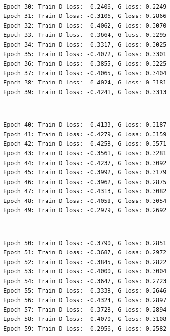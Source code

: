 \documentclass[11pt]{article}
\begin{document}
    \begin{center}
    \end{center}
    { \hspace*{\fill} \\}
    
    \begin{Verbatim}[commandchars=\\\{\}]
Epoch 30: Train D loss: -0.2406, G loss: 0.2249
Epoch 31: Train D loss: -0.3106, G loss: 0.2866
Epoch 32: Train D loss: -0.4062, G loss: 0.3070
Epoch 33: Train D loss: -0.3664, G loss: 0.3295
Epoch 34: Train D loss: -0.3317, G loss: 0.3025
Epoch 35: Train D loss: -0.4072, G loss: 0.3301
Epoch 36: Train D loss: -0.3855, G loss: 0.3225
Epoch 37: Train D loss: -0.4065, G loss: 0.3404
Epoch 38: Train D loss: -0.4024, G loss: 0.3181
Epoch 39: Train D loss: -0.4241, G loss: 0.3313

    \end{Verbatim}

    \begin{center}
    \end{center}
    { \hspace*{\fill} \\}
    
    \begin{Verbatim}[commandchars=\\\{\}]
Epoch 40: Train D loss: -0.4133, G loss: 0.3187
Epoch 41: Train D loss: -0.4279, G loss: 0.3159
Epoch 42: Train D loss: -0.4258, G loss: 0.3571
Epoch 43: Train D loss: -0.3561, G loss: 0.3281
Epoch 44: Train D loss: -0.4237, G loss: 0.3092
Epoch 45: Train D loss: -0.3992, G loss: 0.3179
Epoch 46: Train D loss: -0.3962, G loss: 0.2875
Epoch 47: Train D loss: -0.4313, G loss: 0.3082
Epoch 48: Train D loss: -0.4058, G loss: 0.3054
Epoch 49: Train D loss: -0.2979, G loss: 0.2692

    \end{Verbatim}

    \begin{center}
    \end{center}
    { \hspace*{\fill} \\}
    
    \begin{Verbatim}[commandchars=\\\{\}]
Epoch 50: Train D loss: -0.3790, G loss: 0.2851
Epoch 51: Train D loss: -0.3687, G loss: 0.2972
Epoch 52: Train D loss: -0.3845, G loss: 0.2822
Epoch 53: Train D loss: -0.4000, G loss: 0.3004
Epoch 54: Train D loss: -0.3647, G loss: 0.2723
Epoch 55: Train D loss: -0.3338, G loss: 0.2646
Epoch 56: Train D loss: -0.4324, G loss: 0.2897
Epoch 57: Train D loss: -0.3728, G loss: 0.2894
Epoch 58: Train D loss: -0.4070, G loss: 0.3108
Epoch 59: Train D loss: -0.2956, G loss: 0.2582

    \end{Verbatim}
\end{document}
